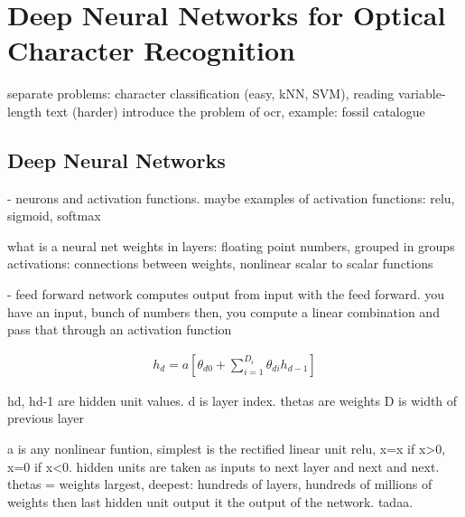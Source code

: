 \documentclass{article}
\begin{document}

\section{Deep Neural Networks for Optical Character Recognition}


separate problems: character classification (easy, kNN, SVM), reading variable-length text (harder) \cite{ocr_survey}
introduce the problem of ocr, example: fossil catalogue


\subsection{Deep Neural Networks}

- neurons and activation functions. maybe examples of activation functions: relu, sigmoid, softmax

what is a neural net
weights in layers: floating point numbers, grouped in groups 
activations: connections between weights, nonlinear scalar to scalar functions 

- feed forward
network computes output from input with the feed forward.
you have an input, bunch of numbers
then, you compute a linear combination and pass that through an activation function 

\begin{align}
h_d = a\left[ \theta_{d0} + \sum_{i=1}^{D_i}\theta_{di}h_{d-1} \right]
\end{align}

hd, hd-1 are hidden unit values. d is layer index. thetas are weights 
D is width of previous layer \cite{princebook}

a is any nonlinear funtion, simplest is the rectified linear unit relu, x=x if x>0, x=0 if x<0.
hidden units are taken as inputs to next layer and next and next. thetas = weights
largest, deepest: hundreds of layers, hundreds of millions of weights 
then last hidden unit output it the output of the network. tadaa.
\end{document}
